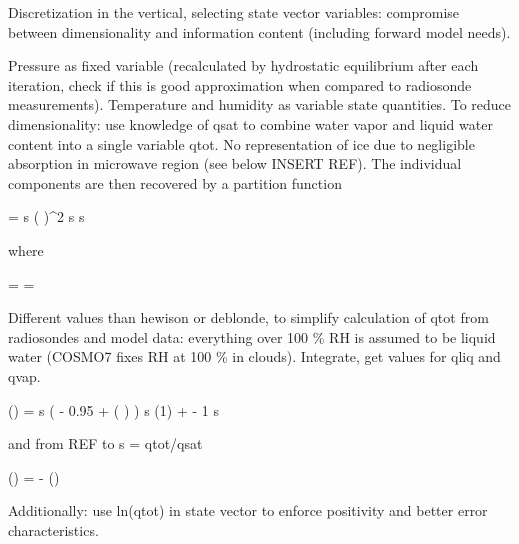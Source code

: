     Discretization in the vertical, selecting state vector variables:
    compromise between dimensionality and information content (including
    forward model needs).

    \startsubsection[title=The Choice of State Vector Variables]

        Pressure as fixed variable (recalculated by hydrostatic equilibrium
        after each iteration, check if this is good approximation when compared
        to radiosonde measurements). Temperature and humidity as variable
        state quantities. To reduce dimensionality: use knowledge of qsat to
        combine water vapor and liquid water content into a single variable
        qtot. No representation of ice due to negligible absorption in
        microwave region (see below INSERT REF). The individual components are
        then recovered by a partition function

        \startformula
            \DERIV{\QLIQ}{\RHL} =  \startcases
                 \MC s  \NR
                \NC \cos \left(   \right)^2
                     \le s  \EQCOMMA\NR
                  \le s \NR
            \stopcases
        \stopformula

        where

        \startformula
            \RHL = \frac{\QTOT}{\QSAT} = \frac{\QVAP + \QLIQ}{\QSAT} \EQSTOP
        \stopformula

        Different values than hewison or deblonde, to simplify calculation
        of qtot from radiosondes and model data: everything over 100 \% RH
        is assumed to be liquid water (COSMO7 fixes RH at 100 \% in clouds).
        Integrate, get values for qliq and qvap.

        \startformula
            \QLIQ(\RHL) = \QSAT \startcases
                 \MC s  \NR
                \NC {} \left( \RHL - 0.95 + 
                    \sin \left(  \right) \right)
                     \le s  \NR
                \NC \QLIQ(1) + \RHL - 1  \le s \NR
            \stopcases
        \stopformula

        and from REF to s = qtot/qsat

        \startformula
            \QVAP(\RHL) = \QSAT \RHL - \QLIQ(\RHL) \EQSTOP
        \stopformula

        Additionally: use ln(qtot) in state vector to enforce positivity and
        better error characteristics.

